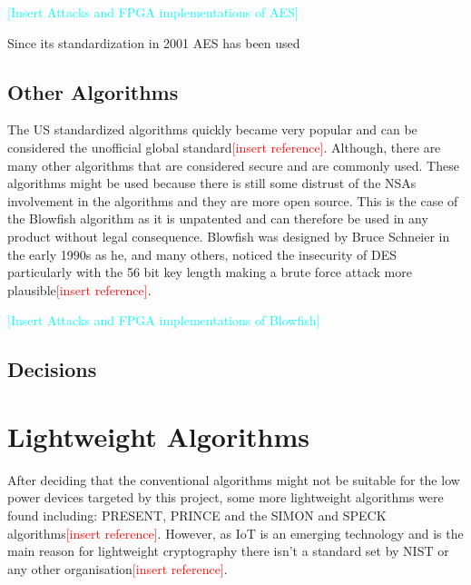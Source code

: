 \documentclass[12pt,twoside,a4paper]{report}
\begin{document}
    \textcolor{cyan}{[Insert Attacks and FPGA implementations of AES]}
    
    Since its standardization in 2001 AES has been used      
    
    \subsection{Other Algorithms}
    The US standardized algorithms quickly became very popular and can be considered the unofficial global standard\textcolor{red}{[insert reference]}.
    Although, there are many other algorithms that are considered secure and are commonly used.
    These algorithms might be used because there is still some distrust of the NSAs involvement in the algorithms and they are more open source.
    This is the case of the Blowfish algorithm as it is unpatented and can therefore be used in any product without legal consequence.
    Blowfish was designed by Bruce Schneier in the early 1990s as he, and many others, noticed the insecurity of DES particularly with the 56 bit key length making a brute force attack more plausible\textcolor{red}{[insert reference]}.
    
    \textcolor{cyan}{[Insert Attacks and FPGA implementations of Blowfish]}
    
    \subsection{Decisions}
    
    \section{Lightweight Algorithms}
    After deciding that the conventional algorithms might not be suitable for the low power devices targeted by this project, some more lightweight algorithms were found including: PRESENT, PRINCE and the SIMON and SPECK algorithms\textcolor{red}{[insert reference]}. However, as IoT is an emerging technology and is the main reason for lightweight cryptography there isn't a standard set by NIST or any other organisation\textcolor{red}{[insert reference]}.
    
\end{document}
